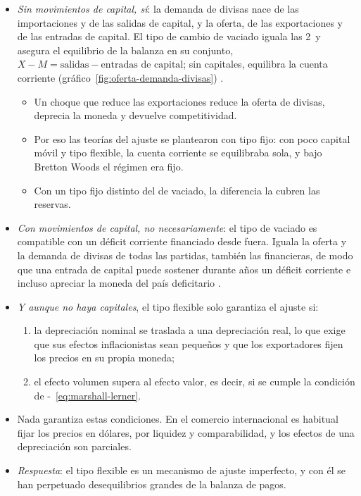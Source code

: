 \documentclass[11pt]{article}
\begin{document}
\begin{itemize}
\item \emph{Sin movimientos de capital, sí}: la demanda de divisas nace de las importaciones y de las salidas de capital, y la oferta, de las exportaciones y de las entradas de capital. El tipo de cambio de vaciado iguala las 2~y asegura el equilibrio de la balanza en su conjunto, $X-M=\text{salidas}-\text{entradas de capital}$; sin capitales, equilibra la cuenta corriente (gráfico~\ref{fig:oferta-demanda-divisas}) .
  \begin{itemize}
  \item Un choque que reduce las exportaciones reduce la oferta de divisas, deprecia la moneda y devuelve competitividad.
  \item Por eso las teorías del ajuste se plantearon con tipo fijo: con poco capital móvil y tipo flexible, la cuenta corriente se equilibraba sola, y bajo Bretton Woods el régimen era fijo.
  \item Con un tipo fijo distinto del de vaciado, la diferencia la cubren las reservas.
  \end{itemize}
\item \emph{Con movimientos de capital, no necesariamente}: el tipo de vaciado es compatible con un déficit corriente financiado desde fuera. Iguala la oferta y la demanda de divisas de todas las partidas, también las financieras, de modo que una entrada de capital puede sostener durante años un déficit corriente e incluso apreciar la moneda del país deficitario\nocite{Kallianiotis2013Exchange} .
\item \emph{Y aunque no haya capitales}, el tipo flexible solo garantiza el ajuste si:
  \begin{enumerate}
  \item la depreciación nominal se traslada a una depreciación real, lo que exige que sus efectos inflacionistas sean pequeños y que los exportadores fijen los precios en su propia moneda;
  \item el efecto volumen supera al efecto valor, es decir, si se cumple la condición de -~\eqref{eq:marshall-lerner}.
  \end{enumerate}
\item Nada garantiza estas condiciones. En el comercio internacional es habitual fijar los precios en dólares, por liquidez y comparabilidad, y los efectos de una depreciación son parciales\nocite{Gopinath2020DCP}.
\item \emph{Respuesta}: el tipo flexible es un mecanismo de ajuste imperfecto, y con él se han perpetuado desequilibrios grandes de la balanza de pagos.
\end{itemize}
\end{document}
